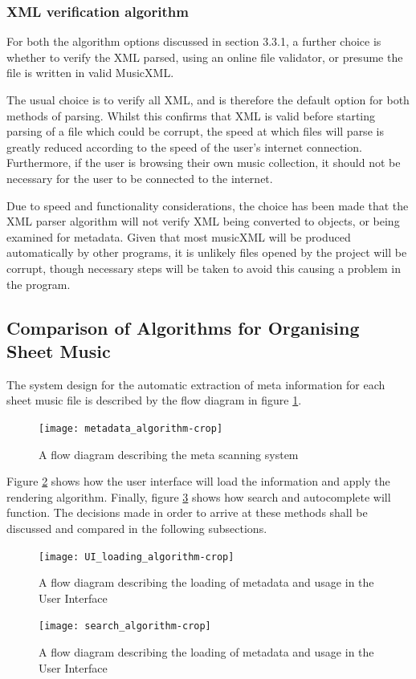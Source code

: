 \subsubsection{XML verification algorithm}
For both the algorithm options discussed in section 3.3.1, a further choice is whether to verify the XML parsed, using an online file validator, or presume the file is written in valid MusicXML. 

The usual choice is to verify all XML, and is therefore the default option for both methods of parsing. Whilst this confirms that XML is valid before starting parsing of a file which could be corrupt, the speed at which files will parse is greatly reduced according to the speed of the user's internet connection.
Furthermore, if the user is browsing their own music collection, it should not be necessary for the user to be connected to the internet.

Due to speed and functionality considerations, the choice has been made that the XML parser algorithm will not verify XML being converted to objects, or being examined for metadata. Given that most musicXML will be produced automatically by other programs, it is unlikely files opened by the project will be corrupt, though necessary steps will be taken to avoid this causing a problem in the program.

\subsection{Comparison of Algorithms for Organising Sheet Music}
The system design for the automatic extraction of meta information for each sheet music file is described by the flow diagram in figure \ref{fig:meta}. 
\begin{figure}[H]
    \centering
    \texttt{[image: metadata\_algorithm-crop]}
    \caption{A flow diagram describing the meta scanning system}
    \label{fig:meta}
\end{figure}

Figure \ref{fig:uiLoader} shows how the user interface will load the information and apply the rendering algorithm. Finally, figure \ref{fig:metaSearching} shows how search and autocomplete will function. The decisions made in order to arrive at these methods shall be discussed and compared in the following subsections.
\begin{figure}[H]
    \centering
    \texttt{[image: UI\_loading\_algorithm-crop]}
    \caption{A flow diagram describing the loading of metadata and usage in the User Interface}
    \label{fig:uiLoader}
\end{figure}
\begin{figure}[H]
    \centering
    \texttt{[image: search\_algorithm-crop]}
    \caption{A flow diagram describing the loading of metadata and usage in the User Interface}
    \label{fig:metaSearching}
\end{figure}

